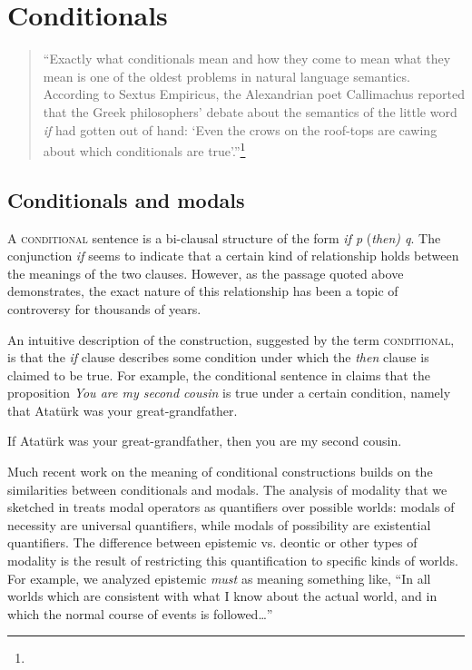 \chapter{Conditionals}\label{sec:19}

\begin{quote}
“Exactly what conditionals mean and how they come to mean what they mean is one of the oldest problems in natural language semantics. According to Sextus Empiricus, the Alexandrian poet Callimachus reported that the Greek philosophers’ debate about the semantics of the little word \textit{if} had gotten out of hand: ‘Even the crows on the roof-tops are cawing about which conditionals are true’.”\footnote{}
\end{quote}

\section{Conditionals and modals}\label{sec:19.1}

A \textsc{conditional} sentence is a bi-clausal structure of the form \textit{if p} (\textit{then) q}. The conjunction \textit{if} seems to indicate that a certain kind of relationship holds between the meanings of the two clauses. However, as the passage quoted above demonstrates, the exact nature of this relationship has been a topic of controversy for thousands of years.



An intuitive description of the construction, suggested by the term \textsc{conditional}, is that the \textit{if} clause describes some condition under which the \textit{then} clause is claimed to be true. For example, the conditional sentence in  claims that the proposition \textit{You are my second cousin} is true under a certain condition, namely that Atatürk was your great-grandfather.


\ea
If Atatürk was your great-grandfather, then you are my second cousin.
\z


Much recent work on the meaning of conditional constructions builds on the similarities between conditionals and modals. The analysis of modality that we sketched in  treats modal operators as quantifiers over possible worlds: modals of necessity are universal quantifiers, while modals of possibility are existential quantifiers. The difference between epistemic vs. deontic or other types of modality is the result of restricting this quantification to specific kinds of worlds. For example, we analyzed epistemic \textit{must} as meaning something like, “In all worlds which are consistent with what I know about the actual world, and in which the normal course of events is followed…”



